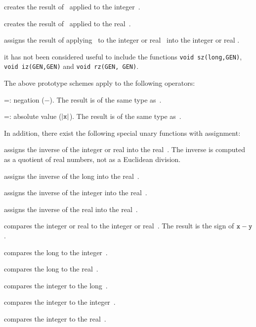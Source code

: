  creates the result of \op\ applied to the
integer~.

 creates the result of \op\ applied to the real~.

 assigns the result of applying \op\ to the
integer or real~ into the integer or real .

 it has not been considered useful to include the
functions {\tt void \op sz(long,GEN)}, {\tt void \op iz(GEN,GEN)} and
{\tt void \op rz(GEN, GEN)}.
\smallskip

\noindent The above prototype schemes apply to the following operators:

\op=: negation ($-$). The result is of the same type
as~.

\op=: absolute value ($|{\tt x}|$). The result is of the same type
as~.

\noindent In addition, there exist the following special unary functions with
assignment:

 assigns the inverse of the integer or
real  into the real~. The inverse is computed as a quotient
of real numbers, not as a Euclidean division.

 assigns the inverse of the long 
into the real~.

 assigns the inverse of the integer 
into the real~.

 assigns the inverse of the real  into
the real~.


 compares the integer or real  to the
integer or real~. The result is the sign of ${\tt x}-{\tt y}$.

 compares the long  to the
integer~.

 compares the long  to the real~.

 compares the integer  to the
long~.

 compares the integer  to the
integer~.

 compares the integer  to the
real~.

